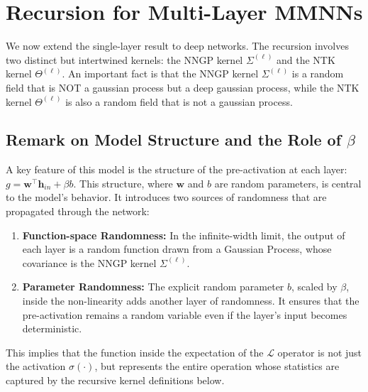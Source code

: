 \documentclass[12pt]{article}
\begin{document}
\section{Recursion for Multi-Layer MMNNs}
We now extend the single-layer result to deep networks. The recursion involves two distinct but intertwined kernels: the NNGP kernel $\Sigma^{(\ell)}$ and the NTK kernel $\Theta^{(\ell)}$.
An important fact is that the NNGP kernel $\Sigma^{(\ell)}$ is a random field that is NOT a gaussian process but a deep gaussian process, while the NTK kernel $\Theta^{(\ell)}$ is also a random field that is not a gaussian process.

\subsection{Remark on Model Structure and the Role of \(\beta\)}
A key feature of this model is the structure of the pre-activation at each layer: $g = \bm{w}^\top \bm{h}_{in} + \beta b$. This structure, where $\bm{w}$ and $b$ are random parameters, is central to the model's behavior. It introduces two sources of randomness that are propagated through the network:
\begin{enumerate}
    \item \textbf{Function-space Randomness:} In the infinite-width limit, the output of each layer is a random function drawn from a Gaussian Process, whose covariance is the NNGP kernel $\Sigma^{(\ell)}$.
    \item \textbf{Parameter Randomness:} The explicit random parameter $b$, scaled by $\beta$, inside the non-linearity adds another layer of randomness. It ensures that the pre-activation remains a random variable even if the layer's input becomes deterministic. 
\end{enumerate}
This implies that the function inside the expectation of the $\mathcal{L}$ operator is not just the activation $\sigma(\cdot)$, but represents the entire operation whose statistics are captured by the recursive kernel definitions below.
\end{document}
